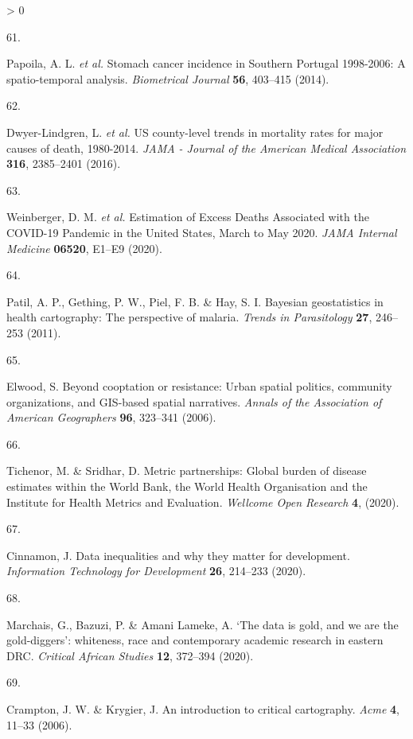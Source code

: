 \documentclass[
]{article}
\newlength{\cslhangindent}
\newlength{\csllabelwidth}
\newenvironment{CSLReferences}[2] %
 {%
  \setlength{\parindent}{0pt}
  \ifodd #1 \everypar{\setlength{\hangindent}{\cslhangindent}}\ignorespaces\fi
  \ifnum #2 > 0
  \setlength{\parskip}{#2\baselineskip}
  \fi
 }%
 {}
\newcommand{\CSLLeftMargin}[1]{\parbox[t]{\csllabelwidth}{#1}}
\newcommand{\CSLRightInline}[1]{\parbox[t]{\linewidth - \csllabelwidth}{#1}\break}
\begin{document}
\begin{CSLReferences}{0}{0}
\leavevmode\hypertarget{ref-Papoila2014}{}%
\CSLLeftMargin{61. }
\CSLRightInline{Papoila, A. L. \emph{et al.} {Stomach cancer incidence in Southern Portugal 1998-2006: A spatio-temporal analysis}. \emph{Biometrical Journal} \textbf{56}, 403--415 (2014).}

\leavevmode\hypertarget{ref-Dwyer-Lindgren2016}{}%
\CSLLeftMargin{62. }
\CSLRightInline{Dwyer-Lindgren, L. \emph{et al.} {US county-level trends in mortality rates for major causes of death, 1980-2014}. \emph{JAMA - Journal of the American Medical Association} \textbf{316}, 2385--2401 (2016).}

\leavevmode\hypertarget{ref-Weinberger2020a}{}%
\CSLLeftMargin{63. }
\CSLRightInline{Weinberger, D. M. \emph{et al.} {Estimation of Excess Deaths Associated with the COVID-19 Pandemic in the United States, March to May 2020}. \emph{JAMA Internal Medicine} \textbf{06520}, E1--E9 (2020).}

\leavevmode\hypertarget{ref-Patil2011}{}%
\CSLLeftMargin{64. }
\CSLRightInline{Patil, A. P., Gething, P. W., Piel, F. B. \& Hay, S. I. {Bayesian geostatistics in health cartography: The perspective of malaria}. \emph{Trends in Parasitology} \textbf{27}, 246--253 (2011).}

\leavevmode\hypertarget{ref-Elwood2006}{}%
\CSLLeftMargin{65. }
\CSLRightInline{Elwood, S. {Beyond cooptation or resistance: Urban spatial politics, community organizations, and GIS-based spatial narratives}. \emph{Annals of the Association of American Geographers} \textbf{96}, 323--341 (2006).}

\leavevmode\hypertarget{ref-Tichenor2020}{}%
\CSLLeftMargin{66. }
\CSLRightInline{Tichenor, M. \& Sridhar, D. {Metric partnerships: Global burden of disease estimates within the World Bank, the World Health Organisation and the Institute for Health Metrics and Evaluation}. \emph{Wellcome Open Research} \textbf{4}, (2020).}

\leavevmode\hypertarget{ref-Cinnamon2020a}{}%
\CSLLeftMargin{67. }
\CSLRightInline{Cinnamon, J. {Data inequalities and why they matter for development}. \emph{Information Technology for Development} \textbf{26}, 214--233 (2020).}

\leavevmode\hypertarget{ref-Marchais2020}{}%
\CSLLeftMargin{68. }
\CSLRightInline{Marchais, G., Bazuzi, P. \& Amani Lameke, A. {`The data is gold, and we are the gold-diggers': whiteness, race and contemporary academic research in eastern DRC}. \emph{Critical African Studies} \textbf{12}, 372--394 (2020).}

\leavevmode\hypertarget{ref-Crampton2006}{}%
\CSLLeftMargin{69. }
\CSLRightInline{Crampton, J. W. \& Krygier, J. {An introduction to critical cartography}. \emph{Acme} \textbf{4}, 11--33 (2006).}


\end{CSLReferences}
\end{document}

